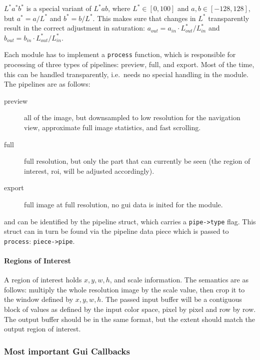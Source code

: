 \documentclass[a4paper,twoside]{scrartcl}
\newcommand{\code}[1]{\texttt{\color{codecol}#1}}
\begin{document}
$L^*a^*b^*$ is a special variant of $L^*ab$, where $L^* \in [0, 100]$ and $a, b \in [-128, 128]$, but $a^* = a/L^*$ and $b^* = b/L^*$.
This makes sure that changes in $L^*$ transparently result in the correct adjustment in saturation:
$a_{out} = a_{in} \cdot L^*_{out}/L^*_{in}$ and
$b_{out} = b_{in} \cdot L^*_{out}/L^*_{in}$.


Each module has to implement a \code{process} function, which is responsible for processing of three types of
pipelines: preview, full, and export. Most of the time, this can be handled transparently, i.e.\ needs no special
handling in the module. The pipelines are as follows:

\begin{description}
  \item[preview] all of the image, but downsampled to low resolution for the navigation view, approximate full image statistics, and fast scrolling.
  \item[full] full resolution, but only the part that can currently be seen (the region of interest, roi, will be adjusted accordingly).
  \item[export] full image at full resolution, no gui data is inited for the module.
\end{description}

and can be identified by the pipeline struct, which carries a \code{pipe->type} flag. This struct can in turn be found
via the pipeline data piece which is passed to \code{process}: \code{piece->pipe}.

\paragraph{Regions of Interest}

A region of interest holds $x,y,w,h$, and scale information. The semantics are as follows: multiply the whole resolution image by
the scale value, then crop it to the window defined by $x, y, w, h$. The passed input buffer will be a contiguous block of values as defined by
the input color space, pixel by pixel and row by row. The output buffer should be in the same format, but the extent should match the
output region of interest.


\subsubsection{Most important Gui Callbacks}
\end{document}

